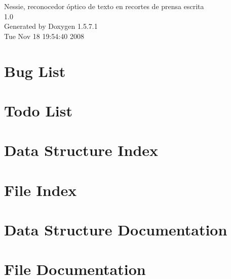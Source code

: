 \documentclass[a4paper]{article}
\begin{document}
\begin{titlepage}
\vspace*{7cm}
\begin{center}
{\Large Nessie, reconocedor óptico de texto en recortes de prensa escrita \\[1ex]\large 1.0 }\\
\vspace*{1cm}
{\large Generated by Doxygen 1.5.7.1}\\
\vspace*{0.5cm}
{\small Tue Nov 18 19:54:40 2008}\\
\end{center}
\end{titlepage}
\tableofcontents
{}
\section{Bug List}
\label{bug}
\hypertarget{bug}{}

\section{Todo List}
\label{todo}
\hypertarget{todo}{}

\section{Data Structure Index}

\section{File Index}

\section{Data Structure Documentation}












\section{File Documentation}

























\printindex
\end{document}
